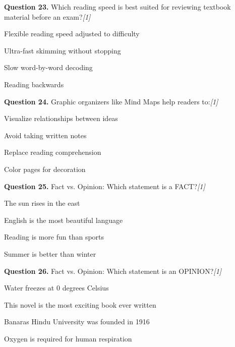 \documentclass[11pt,a4paper]{article}
\newcommand{\pts}[1]{\hfill   \textit{[#1]}}
\begin{document}
\medskip




\noindent   \textbf{Question 23.} Which reading speed is best suited for reviewing textbook material before an exam?\pts{1}

\begin{parts}
  \item Flexible reading speed adjusted to difficulty
  \item Ultra-fast skimming without stopping
  \item Slow word-by-word decoding
  \item Reading backwards
\end{parts}

\medskip




\noindent   \textbf{Question 24.} Graphic organizers like Mind Maps help readers to:\pts{1}

\begin{parts}
  \item Visualize relationships between ideas
  \item Avoid taking written notes
  \item Replace reading comprehension
  \item Color pages for decoration
\end{parts}

\medskip




\noindent   \textbf{Question 25.} Fact vs. Opinion: Which statement is a FACT?\pts{1}

\begin{parts}
  \item The sun rises in the east
  \item English is the most beautiful language
  \item Reading is more fun than sports
  \item Summer is better than winter
\end{parts}

\medskip




\noindent   \textbf{Question 26.} Fact vs. Opinion: Which statement is an OPINION?\pts{1}

\begin{parts}
  \item Water freezes at 0 degrees Celsius
  \item This novel is the most exciting book ever written
  \item Banaras Hindu University was founded in 1916
  \item Oxygen is required for human respiration
\end{parts}
\end{document}
